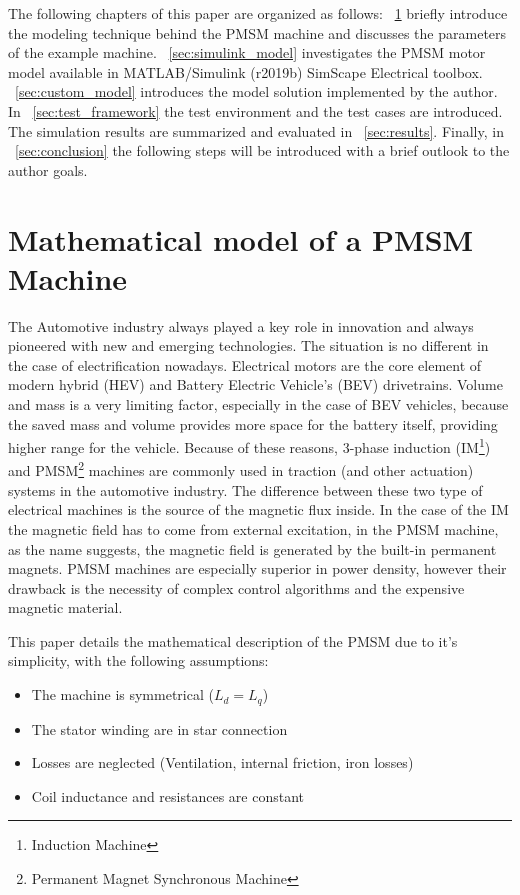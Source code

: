 \documentclass[twoside,b5paper,10pt]{article}
\begin{document}
The following chapters of this paper are organized as follows: \sectionname~\ref{sec:matPMSM} briefly introduce the modeling technique behind the PMSM machine and discusses the parameters of the example machine. \sectionname~\ref{sec:simulink_model} investigates the PMSM motor model available in MATLAB/Simulink (r2019b) SimScape Electrical toolbox. \sectionname~\ref{sec:custom_model} introduces the model solution implemented by the author. In \sectionname~\ref{sec:test_framework} the test environment and the test cases are introduced. The simulation results are summarized and evaluated in \sectionname~\ref{sec:results}. Finally, in \sectionname~\ref{sec:conclusion} the following steps will be introduced with a brief outlook to the author goals. 


\section{Mathematical model of a PMSM Machine}
\label{sec:matPMSM}

The Automotive industry always played a key role in innovation and always pioneered with new and emerging technologies. The situation is no different in the case of electrification nowadays. Electrical motors are the core element of modern hybrid (HEV) and Battery Electric Vehicle's (BEV) drivetrains. Volume and mass is a very limiting factor, especially in the case of BEV vehicles, because the saved mass and volume provides more space for the battery itself, providing higher range for the vehicle. Because of these reasons, 3-phase induction (IM\footnote{Induction Machine}) and PMSM\footnote{Permanent Magnet Synchronous Machine} machines are commonly used in traction (and other actuation) systems in the automotive industry. The difference between these two type of electrical machines is the source of the magnetic flux inside. In the case of the IM the magnetic field has to come from external excitation, in the PMSM machine, as the name suggests, the magnetic field is generated by the built-in permanent magnets. PMSM machines are especially superior in power density, however their drawback is the necessity of complex control algorithms and the expensive magnetic material.



This paper details the mathematical description of the PMSM due to it's simplicity, with the following assumptions:
\begin{itemize}
  \item The machine is symmetrical ($L_d = L_q$)
  \item The stator winding are in star connection
  \item Losses are neglected (Ventilation, internal friction, iron losses)
  \item Coil inductance and resistances are constant
\end{itemize}
\end{document}
